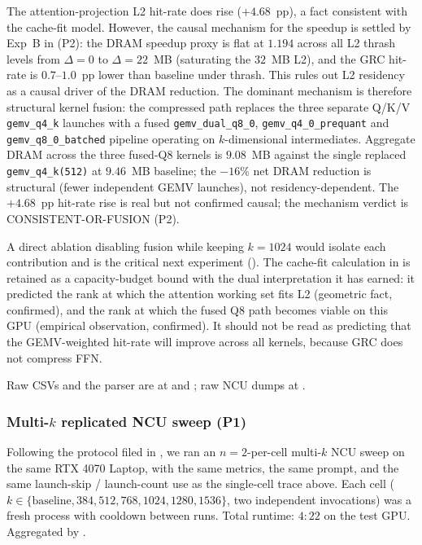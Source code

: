 \documentclass[11pt]{article}
\begin{document}
The attention-projection L2 hit-rate does rise ($+4.68$~pp), a fact
consistent with the cache-fit model. However, the causal mechanism for the
speedup is settled by Exp~B in  (P2): the DRAM
speedup proxy is flat at $1.194$ across all L2 thrash levels from
$\Delta{=}0$ to $\Delta{=}22$~MB (saturating the $32$~MB L2), and the GRC
hit-rate is $0.7$--$1.0$~pp lower than baseline under thrash.
This rules out L2 residency as a causal driver of the DRAM reduction.
The dominant mechanism is therefore structural kernel fusion: the
compressed path replaces the three separate Q/K/V \texttt{gemv\_q4\_k}
launches with a fused \texttt{gemv\_dual\_q8\_0}, \texttt{gemv\_q4\_0\_prequant}
and \texttt{gemv\_q8\_0\_batched} pipeline operating on $k$-dimensional
intermediates. Aggregate DRAM across the three fused-Q8 kernels is $9.08$~MB
against the single replaced \texttt{gemv\_q4\_k(512)} at $9.46$~MB baseline;
the $-16\%$ net DRAM reduction is structural (fewer independent GEMV
launches), not residency-dependent. The $+4.68$~pp hit-rate rise is real but
not confirmed causal; the mechanism verdict is CONSISTENT-OR-FUSION (P2).

A direct ablation disabling fusion while keeping $k{=}1024$ would isolate
each contribution and is the critical next experiment ().
The cache-fit calculation in  is retained as a
capacity-budget bound with the dual interpretation it has earned: it
predicted the rank at which the attention working set fits L2 (geometric
fact, confirmed), and the rank at which the fused Q8 path becomes
viable on this GPU (empirical observation, confirmed). It should not be
read as predicting that the GEMV-weighted hit-rate will improve across all
kernels, because GRC does not compress FFN.

Raw CSVs and the parser are at
 and
; raw NCU dumps at
.

\subsubsection{Multi-$k$ replicated NCU sweep (P1)}
\label{sec:multi-k-ncu}

Following the protocol filed in , we ran an
$n{=}2$-per-cell multi-$k$ NCU sweep on the same RTX 4070 Laptop, with
the same metrics, the same prompt, and the same launch-skip /
launch-count use as the single-cell trace above. Each cell
($k\in\{\text{baseline}, 384, 512, 768, 1024, 1280, 1536\}$, two
independent invocations) was a fresh process with cooldown between
runs. Total runtime: $4{:}22$ on the test GPU. Aggregated by
.
\end{document}
